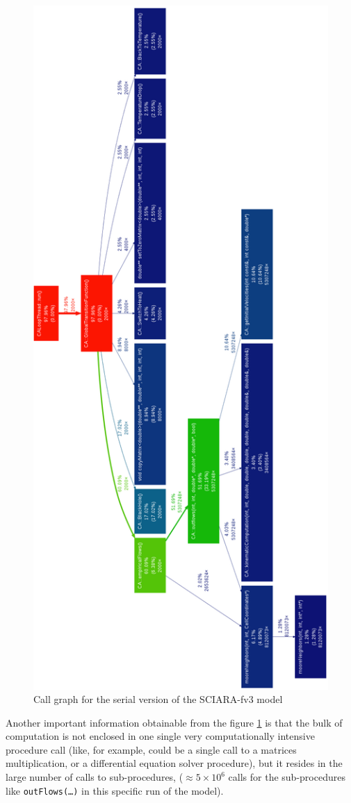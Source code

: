 \begin{figure}[p] \vspace*{-2cm}
\includegraphics[width=0.67\linewidth]{./images/profiling}
\caption{Call graph for the serial version of the SCIARA-fv3 model}
\label{stackCall}
\end{figure}
Another important information  obtainable from the figure \ref{stackCall} is
that the bulk of computation  is not enclosed in one single very computationally
intensive procedure call (like, for example, could be a single call to a
matrices multiplication, or a differential equation solver procedure), but it
resides in the large number of calls to sub-procedures, (\(\approx5\times10^6\)
calls for the sub-procedures like \texttt{outFlows(\ldots)} in this specific run
of the model).




